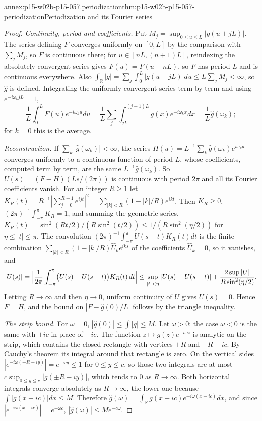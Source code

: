 \begin{annexitem}{annex:p15-w02b-p15-057.periodization}{thm:p15-w02b-p15-057-periodization}{Periodization and its Fourier series}
\begin{proof}
\emph{Continuity, period and coefficients.} Put
\(M_j=\sup_{0\leq u\leq L}|g(u+jL)|\). The series defining \(F\) converges
uniformly on \([0,L]\) by the comparison with \(\sum_jM_j\), so \(F\) is
continuous there; for \(u\in[nL,(n+1)L]\), reindexing the absolutely
convergent series gives \(F(u)=F(u-nL)\), so \(F\) has period \(L\) and is
continuous everywhere. Also
\(\int_{\mathbb R}|g|=\sum_j\int_0^L|g(u+jL)|du\leq L\sum_jM_j<\infty\), so
\(\widehat g\) is defined. Integrating the uniformly convergent series term
by term and using \(e^{-i\omega_kjL}=1\),
\[
 \frac1L\int_0^LF(u)e^{-i\omega_ku}du
 =\frac1L\sum_j\int_{jL}^{(j+1)L}g(x)e^{-i\omega_kx}dx
 =\frac1L\widehat g(\omega_k);
\]
for \(k=0\) this is the average.

\emph{Reconstruction.} If \(\sum_k|\widehat g(\omega_k)|<\infty\), the
series \(H(u)=L^{-1}\sum_k\widehat g(\omega_k)e^{i\omega_ku}\) converges
uniformly to a continuous function of period \(L\), whose coefficients,
computed term by term, are the same \(L^{-1}\widehat g(\omega_k)\). So
\(U(s)=(F-H)(Ls/(2\pi))\) is continuous with period \(2\pi\) and all its
Fourier coefficients vanish. For an integer \(R\geq1\) let
\(K_R(t)=R^{-1}|\sum_{j=0}^{R-1}e^{ijt}|^2=\sum_{|k|<R}(1-|k|/R)e^{ikt}\).
Then \(K_R\geq0\), \((2\pi)^{-1}\int_{-\pi}^{\pi}K_R=1\), and summing the
geometric series, \(K_R(t)=\sin^2(Rt/2)/(R\sin^2(t/2))\leq
1/(R\sin^2(\eta/2))\) for \(\eta\leq|t|\leq\pi\). The convolution
\((2\pi)^{-1}\int_{-\pi}^{\pi}U(s-t)K_R(t)dt\) is the finite combination
\(\sum_{|k|<R}(1-|k|/R)\hat U_ke^{iks}\) of the coefficients \(\hat U_k=0\),
so it vanishes, and
\[
 |U(s)|=\Bigl|\frac1{2\pi}\int_{-\pi}^{\pi}\bigl(U(s)-U(s-t)\bigr)K_R(t)\,dt\Bigr|
 \leq\sup_{|t|<\eta}|U(s)-U(s-t)|+\frac{2\sup|U|}{R\sin^2(\eta/2)}.
\]
Letting \(R\to\infty\) and then \(\eta\to0\), uniform continuity of \(U\)
gives \(U(s)=0\). Hence \(F=H\), and the bound on \(|F-\widehat g(0)/L|\)
follows by the triangle inequality.

\emph{The strip bound.} For \(\omega=0\), \(|\widehat g(0)|\leq\int|g|\leq
M\). Let \(\omega>0\); the case \(\omega<0\) is the same with \(+ic\) in
place of \(-ic\). The function \(z\mapsto g(z)e^{-i\omega z}\) is analytic
on the strip, which contains the closed rectangle with vertices
\(\pm R\) and \(\pm R-ic\). By Cauchy's theorem its integral around that
rectangle is zero. On the vertical sides \(|e^{-i\omega(\pm R-iy)}|=
e^{-\omega y}\leq1\) for \(0\leq y\leq c\), so those two integrals are at
most \(c\sup_{0\leq y\leq c}|g(\pm R-iy)|\), which tends to \(0\) as
\(R\to\infty\). Both horizontal integrals converge absolutely as
\(R\to\infty\), the lower one because
\(\int|g(x-ic)|dx\leq M\). Therefore
\(\widehat g(\omega)=\int_{\mathbb R}g(x-ic)e^{-i\omega(x-ic)}dx\), and since
\(|e^{-i\omega(x-ic)}|=e^{-\omega c}\), \(|\widehat g(\omega)|\leq Me^{-c\omega}\).
\end{proof}
\end{annexitem}

